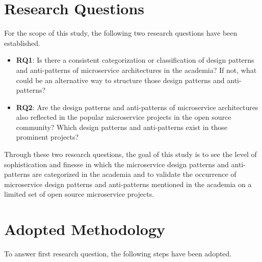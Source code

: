 \documentclass{Configuration_Files/PoliMi3i_thesis}
\begin{document}
\section{Research Questions}
\label{sec:research_questions}

For the scope of this study, the following two research questions have been established.

\begin{itemize}
    \item \textbf{RQ1}: Is there a consistent categorization or classification of design patterns and anti-patterns of microservice architectures in the academia?
    If not, what could be an alternative way to structure those design patterns and anti-patterns?
    
    \item \textbf{RQ2}: Are the design patterns and anti-patterns of microservice architectures also reflected in the popular microservice projects in the open source community?
    Which design patterns and anti-patterns exist in those prominent projects?
\end{itemize}

Through these two research questions, the goal of this study is to see the level of sophistication and finesse in which the microservice design patterns and anti-patterns are categorized in the academia and to validate the occurrence of microservice design patterns and anti-patterns mentioned in the academia on a limited set of open source microservice projects.

\section{Adopted Methodology}
\label{sec:adopted_method}

To answer first research question, the following steps have been adopted.
\end{document}
